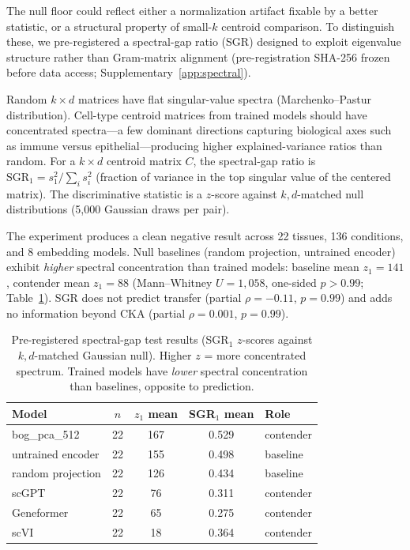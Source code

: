 \documentclass[11pt]{article}
\begin{document}
The null floor could reflect either a normalization artifact fixable by
a better statistic, or a structural property of small-$k$ centroid
comparison. To distinguish these, we pre-registered a spectral-gap
ratio (SGR) designed to exploit eigenvalue structure rather than
Gram-matrix alignment (pre-registration SHA-256 frozen before data
access; Supplementary~\ref{app:spectral}).

Random $k \times d$ matrices have flat singular-value spectra
(Marchenko--Pastur distribution). Cell-type centroid matrices from
trained models should have concentrated spectra---a few dominant
directions capturing biological axes such as immune versus
epithelial---producing higher explained-variance ratios than random.
For a $k \times d$ centroid matrix $C$, the spectral-gap ratio is
$\mathrm{SGR}_1 = s_1^2 / \sum_i s_i^2$ (fraction of variance in the
top singular value of the centered matrix). The discriminative
statistic is a $z$-score against $k,d$-matched null distributions
(5,000 Gaussian draws per pair).

The experiment produces a clean negative result across 22 tissues,
136 conditions, and 8 embedding models. Null baselines (random
projection, untrained encoder) exhibit \emph{higher} spectral
concentration than trained models: baseline mean $z_1 = 141$,
contender mean $z_1 = 88$ (Mann--Whitney $U = 1{,}058$, one-sided
$p > 0.99$; Table~\ref{tab:sgr}). SGR does not predict transfer
(partial $\rho = -0.11$, $p = 0.99$) and adds no information beyond
CKA (partial $\rho = 0.001$, $p = 0.99$).

\begin{table}[t]
\centering
\caption{Pre-registered spectral-gap test results (SGR$_1$ $z$-scores
against $k,d$-matched Gaussian null). Higher $z$ = more concentrated
spectrum. Trained models have \emph{lower} spectral concentration than
baselines, opposite to prediction.}
\label{tab:sgr}
\small
\begin{tabular}{@{}lcccl@{}}
\toprule
Model & $n$ & $z_1$ mean & SGR$_1$ mean & Role \\
\midrule
bog\_pca\_512           & 22 & 167 & 0.529 & contender \\
untrained encoder       & 22 & 155 & 0.498 & baseline \\
random projection       & 22 & 126 & 0.434 & baseline \\
scGPT                   & 22 & 76  & 0.311 & contender \\
Geneformer              & 22 & 65  & 0.275 & contender \\
scVI                    & 22 & 18  & 0.364 & contender \\
\bottomrule
\end{tabular}
\end{table}
\end{document}
